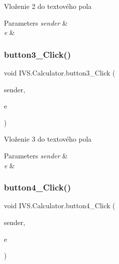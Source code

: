 Vloženie \textquotesingle{}2\textquotesingle{} do textového pola 


\begin{DoxyParams}{Parameters}
{\em sender} & \\
\hline
{\em e} & \\
\hline
\end{DoxyParams}
\mbox{\label{class_i_v_s_1_1_calculator_a4478858fe2f745473de5b68a7a57b2f3}} 
\subsubsection{\texorpdfstring{button3\+\_\+\+Click()}{button3\_Click()}}
{\footnotesize\ttfamily void I\+V\+S.\+Calculator.\+button3\+\_\+\+Click (\begin{DoxyParamCaption}\item[{object}]{sender,  }\item[{Event\+Args}]{e }\end{DoxyParamCaption})\hspace{0.3cm}{\ttfamily [protected]}}



Vloženie \textquotesingle{}3\textquotesingle{} do textového pola 


\begin{DoxyParams}{Parameters}
{\em sender} & \\
\hline
{\em e} & \\
\hline
\end{DoxyParams}
\mbox{\label{class_i_v_s_1_1_calculator_ac1763f222a684150c84c3fe98c0820e1}} 
\subsubsection{\texorpdfstring{button4\+\_\+\+Click()}{button4\_Click()}}
{\footnotesize\ttfamily void I\+V\+S.\+Calculator.\+button4\+\_\+\+Click (\begin{DoxyParamCaption}\item[{object}]{sender,  }\item[{Event\+Args}]{e }\end{DoxyParamCaption})\hspace{0.3cm}{\ttfamily [protected]}}



